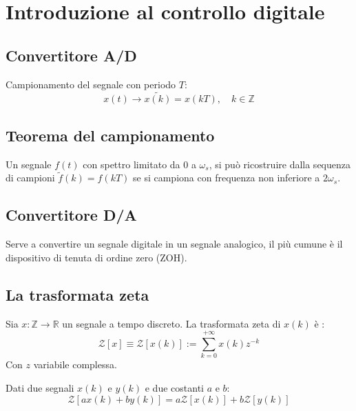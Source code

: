 \section{Introduzione al controllo digitale}

\subsection{Convertitore A/D}

Campionamento del segnale con periodo $T$:
\begin{equation}
  x(t) \rightarrow \tilde{x(k)} = x(kT), \quad k \in \mathbb{Z}
\end{equation}

\subsection{Teorema del campionamento}

Un segnale $f(t)$ con spettro limitato da $0$ a $\omega_s$, si può ricostruire
dalla sequenza di campioni $\tilde{f}(k) = f(kT)$ se si campiona con frequenza
non inferiore a $2\omega_s$.

\subsection{Convertitore D/A}

Serve a convertire un segnale digitale in un segnale analogico, il più
cumune è il dispositivo di tenuta di ordine zero (ZOH).


\subsection{La trasformata zeta}

\begin{definition}
  Sia $x: \mathbb{Z} \rightarrow \mathbb{R}$ un segnale a tempo discreto.
  La trasformata zeta di $x(k)$ è :
  \begin{equation}
    \mathcal{Z}[x] \equiv \mathcal{Z}[x(k)] := \sum_{k=0}^{+\infty} x(k) z^{-k}
  \end{equation}
  Con $z$ variabile complessa.
\end{definition}



\begin{definition}
Dati due segnali $x(k)$ e $y(k)$ e due costanti $a$ e $b$:
\begin{equation}
  \mathcal{Z}[ax(k) + by(k)] = a \mathcal{Z}[x(k)] + b \mathcal{Z}[y(k)]
\end{equation}
\end{definition}


